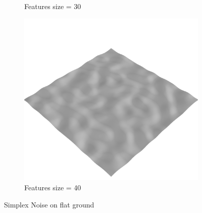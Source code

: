 \documentclass[../document.tex]{subfiles}
\begin{document}
\begin{figure}[H]
\begin{subfigure}[b]{0.32\textwidth}
            \caption{Features size = 30}
        \end{subfigure}    
        \begin{subfigure}[b]{0.32\textwidth}
            \includegraphics[width=\textwidth]{../img/data-aug/3d/simplex4.png}
            \caption{Features size = 40}
        \end{subfigure}    
    \label{fig: simplex-noise}
    \caption{Simplex Noise on flat ground}    
\end{figure}
\end{document}
